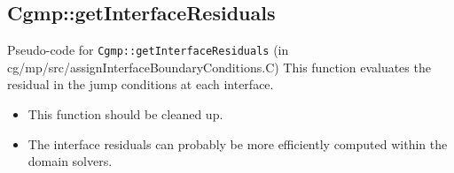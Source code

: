 \clearpage
\subsection{Cgmp::getInterfaceResiduals} \label{sec:getInterfaceResiduals}
Pseudo-code for {\tt Cgmp::getInterfaceResiduals} (in cg/mp/src/assignInterfaceBoundaryConditions.C)
This function evaluates the residual in the jump conditions at each interface.

\mni
{\red 
\begin{itemize}[noitemsep]
   \item This function should be cleaned up.
   \item The interface residuals can probably be more efficiently computed within the domain solvers.
\end{itemize}
}

